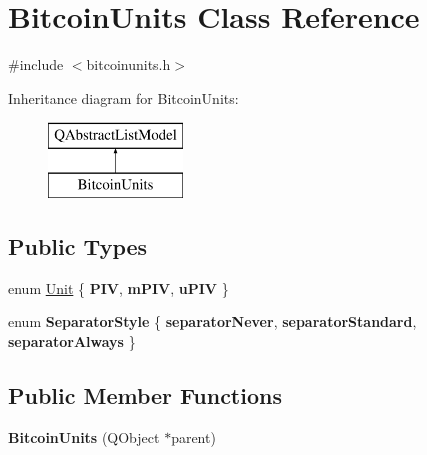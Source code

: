 \hypertarget{class_bitcoin_units}{}\section{Bitcoin\+Units Class Reference}
\label{class_bitcoin_units}


{\ttfamily \#include $<$bitcoinunits.\+h$>$}

Inheritance diagram for Bitcoin\+Units\+:\begin{figure}[H]
\begin{center}
\leavevmode
\includegraphics[height=2.000000cm]{class_bitcoin_units}
\end{center}
\end{figure}
\subsection*{Public Types}
\begin{DoxyCompactItemize}
\item 
enum \mbox{\hyperlink{class_bitcoin_units_ae41018ba530b4c8bdc74fd163709fb9d}{Unit}} \{ {\bfseries P\+IV}, 
{\bfseries m\+P\+IV}, 
{\bfseries u\+P\+IV}
 \}
\item 
\mbox{\label{class_bitcoin_units_a5151919ed4f75e0597047b0287b9ebf8}} 
enum {\bfseries Separator\+Style} \{ {\bfseries separator\+Never}, 
{\bfseries separator\+Standard}, 
{\bfseries separator\+Always}
 \}
\end{DoxyCompactItemize}
\subsection*{Public Member Functions}
\begin{DoxyCompactItemize}
\item 
\mbox{\label{class_bitcoin_units_ae4ca04589b255e9fc4c8dd28c56a7347}} 
{\bfseries Bitcoin\+Units} (Q\+Object $\ast$parent)
\end{DoxyCompactItemize}
